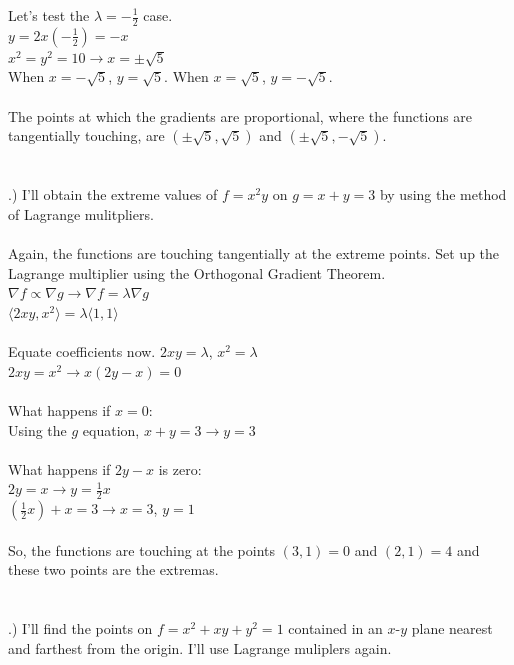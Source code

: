 \documentclass[12pt]{article}
\begin{document}
\noindent Let's test the $\lambda = -\frac{1}{2}$ case.\\
\noindent $y = 2x(-\frac{1}{2}) = -x$\\
\noindent $x^{2} = y^{2} = 10 \rightarrow x = \pm\sqrt{5}$\\
\noindent When $x = -\sqrt{5}$, $y = \sqrt{5}$. When $x = \sqrt{5}$, $y = -\sqrt{5}$.\\\\
\noindent The points at which the gradients are proportional, where the functions are tangentially touching,
 are $(\pm \sqrt{5}, \sqrt{5})$ and $(\pm \sqrt{5}, -\sqrt{5})$.\\\\\\

.) I'll obtain the extreme values of $f = x^{2}y$ on $g = x+y=3$ by using the method of Lagrange mulitpliers.\\\\
\noindent Again, the functions are touching tangentially at the extreme points. Set up the Lagrange multiplier using the Orthogonal Gradient Theorem. 
\noindent $\nabla f \propto \nabla g \rightarrow \nabla f = \lambda \nabla g$\\
\noindent $ \langle 2xy,x^{2}\rangle = \lambda \langle 1, 1\rangle$\\\\
\noindent Equate coefficients now. $2xy = \lambda$, \hspace{10pt} $x^{2} = \lambda$\\
\noindent $2xy = x^{2} \rightarrow x(2y -x) = 0$\\\\
\noindent What happens if $x = 0$:\\
\noindent Using the $g$ equation, $x + y = 3 \rightarrow y = 3$\\\\
\noindent What happens if $2y -x$ is zero:\\
\noindent $2y = x \rightarrow y = \frac{1}{2}x$\\
\noindent $(\frac{1}{2}x) + x = 3 \rightarrow x = 3$, $y = 1$\\\\
\noindent So, the functions are touching at the points $(3, 1) = 0$ and $(2, 1) = 4$ and these two points are the extremas. \\\\\\
.) I'll find the points on $f = x^{2}+xy+y^{2} = 1$ contained in an $x$-$y$ plane nearest and farthest from the origin. I'll use Lagrange muliplers again.\\\\
\end{document}
